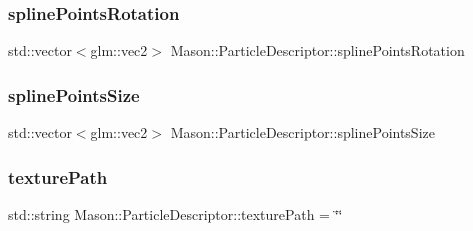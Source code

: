 \hypertarget{class_mason_1_1_particle_descriptor_aad86105e768cb5cf59c26d1277ccad2e}{}\label{class_mason_1_1_particle_descriptor_aad86105e768cb5cf59c26d1277ccad2e} 
\subsubsection{\texorpdfstring{spline\+Points\+Rotation}{splinePointsRotation}}
{\footnotesize\ttfamily std\+::vector$<$glm\+::vec2$>$ Mason\+::\+Particle\+Descriptor\+::spline\+Points\+Rotation}

\hypertarget{class_mason_1_1_particle_descriptor_aefa11cd147ec20d3084c661245abb49c}{}\label{class_mason_1_1_particle_descriptor_aefa11cd147ec20d3084c661245abb49c} 
\subsubsection{\texorpdfstring{spline\+Points\+Size}{splinePointsSize}}
{\footnotesize\ttfamily std\+::vector$<$glm\+::vec2$>$ Mason\+::\+Particle\+Descriptor\+::spline\+Points\+Size}

\hypertarget{class_mason_1_1_particle_descriptor_a060bb2c95075b3a19432beca816bfa76}{}\label{class_mason_1_1_particle_descriptor_a060bb2c95075b3a19432beca816bfa76} 
\subsubsection{\texorpdfstring{texture\+Path}{texturePath}}
{\footnotesize\ttfamily std\+::string Mason\+::\+Particle\+Descriptor\+::texture\+Path = \char`\"{}\char`\"{}}

\hypertarget{class_mason_1_1_particle_descriptor_a015f949d8089667eea16540fb750f70a}{}\label{class_mason_1_1_particle_descriptor_a015f949d8089667eea16540fb750f70a} 
